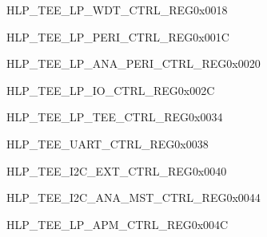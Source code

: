 \begin{register}{H}{LP\_TEE\_LP\_WDT\_CTRL\_REG}{0x0018}\label{regdesc:LPTEELPWDTCTRLREG}
\end{register}\vspace{-3em}

\begin{register}{H}{LP\_TEE\_LP\_PERI\_CTRL\_REG}{0x001C}\label{regdesc:LPTEELPPERICTRLREG}
\end{register}\vspace{-3em}

\begin{register}{H}{LP\_TEE\_LP\_ANA\_PERI\_CTRL\_REG}{0x0020}\label{regdesc:LPTEELPANAPERICTRLREG}
\end{register}\vspace{-3em}

\begin{register}{H}{LP\_TEE\_LP\_IO\_CTRL\_REG}{0x002C}\label{regdesc:LPTEELPIOCTRLREG}
\end{register}\vspace{-3em}

\begin{register}{H}{LP\_TEE\_LP\_TEE\_CTRL\_REG}{0x0034}\label{regdesc:LPTEELPTEECTRLREG}
\end{register}\vspace{-3em}

\begin{register}{H}{LP\_TEE\_UART\_CTRL\_REG}{0x0038}\label{regdesc:LPTEEUARTCTRLREG}
\end{register}\vspace{-3em}

\begin{register}{H}{LP\_TEE\_I2C\_EXT\_CTRL\_REG}{0x0040}\label{regdesc:LPTEEI2CEXTCTRLREG}
\end{register}\vspace{-3em}

\begin{register}{H}{LP\_TEE\_I2C\_ANA\_MST\_CTRL\_REG}{0x0044}\label{regdesc:LPTEEI2CANAMSTCTRLREG}
\end{register}\vspace{-3em}

\begin{register}{H}{LP\_TEE\_LP\_APM\_CTRL\_REG}{0x004C}\label{regdesc:LPTEELPAPMCTRLREG}
\end{register}\vspace{-3em}

